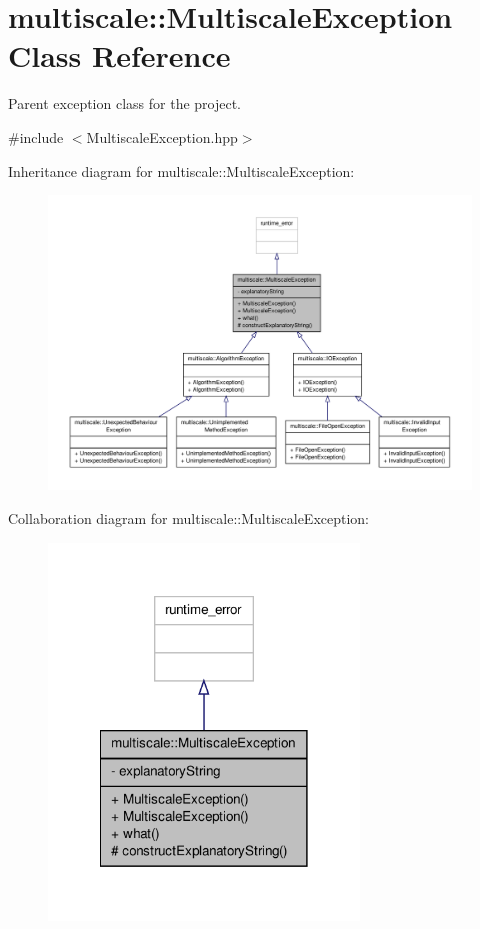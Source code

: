 \hypertarget{classmultiscale_1_1MultiscaleException}{\section{multiscale\-:\-:Multiscale\-Exception Class Reference}
\label{classmultiscale_1_1MultiscaleException}
}


Parent exception class for the project.  




{\ttfamily \#include $<$Multiscale\-Exception.\-hpp$>$}



Inheritance diagram for multiscale\-:\-:Multiscale\-Exception\-:\nopagebreak
\begin{figure}[H]
\begin{center}
\leavevmode
\includegraphics[width=350pt]{classmultiscale_1_1MultiscaleException__inherit__graph}
\end{center}
\end{figure}


Collaboration diagram for multiscale\-:\-:Multiscale\-Exception\-:\nopagebreak
\begin{figure}[H]
\begin{center}
\leavevmode
\includegraphics[width=234pt]{classmultiscale_1_1MultiscaleException__coll__graph}
\end{center}
\end{figure}
